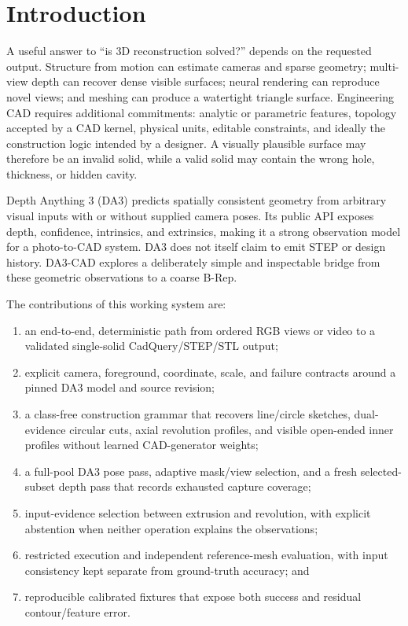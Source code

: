 \documentclass[10pt]{article}
\newcommand{\system}{DA3-CAD}
\begin{document}
\section{Introduction}

A useful answer to ``is 3D reconstruction solved?'' depends on the requested
output.  Structure from motion can estimate cameras and sparse geometry;
multi-view depth can recover dense visible surfaces; neural rendering can
reproduce novel views; and meshing can produce a watertight triangle surface.
Engineering CAD requires additional commitments: analytic or parametric
features, topology accepted by a CAD kernel, physical units, editable
constraints, and ideally the construction logic intended by a designer.  A
visually plausible surface may therefore be an invalid solid, while a valid
solid may contain the wrong hole, thickness, or hidden cavity.

Depth Anything 3 (DA3) predicts spatially consistent geometry from arbitrary
visual inputs with or without supplied camera poses\cite{lin2025depthanything3}.
Its public API exposes depth, confidence, intrinsics, and extrinsics, making it
a strong observation model for a photo-to-CAD system.  DA3 does not itself
claim to emit STEP or design history.  \system{} explores a deliberately simple
and inspectable bridge from these geometric observations to a coarse B-Rep.

The contributions of this working system are:
\begin{enumerate}
  \item an end-to-end, deterministic path from ordered RGB views or video to a
        validated single-solid CadQuery/STEP/STL output;
  \item explicit camera, foreground, coordinate, scale, and failure contracts
        around a pinned DA3 model and source revision;
  \item a class-free construction grammar that recovers line/circle sketches,
        dual-evidence circular cuts, axial revolution profiles, and visible
        open-ended inner profiles without learned CAD-generator weights;
  \item a full-pool DA3 pose pass, adaptive mask/view selection, and a fresh
        selected-subset depth pass that records exhausted capture coverage;
  \item input-evidence selection between extrusion and revolution, with explicit
        abstention when neither operation explains the observations;
  \item restricted execution and independent reference-mesh evaluation, with
        input consistency kept separate from ground-truth accuracy; and
  \item reproducible calibrated fixtures that expose both success and residual
        contour/feature error.
\end{enumerate}
\end{document}
